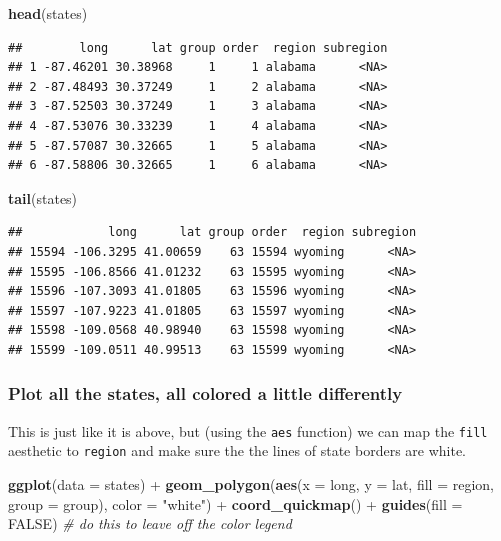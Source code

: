 \documentclass[]{book}
\newenvironment{Shaded}{\begin{snugshade}}{\end{snugshade}}
\newcommand{\KeywordTok}[1]{\textcolor[rgb]{0.13,0.29,0.53}{\textbf{{#1}}}}
\newcommand{\DataTypeTok}[1]{\textcolor[rgb]{0.13,0.29,0.53}{{#1}}}
\newcommand{\StringTok}[1]{\textcolor[rgb]{0.31,0.60,0.02}{{#1}}}
\newcommand{\CommentTok}[1]{\textcolor[rgb]{0.56,0.35,0.01}{\textit{{#1}}}}
\newcommand{\OtherTok}[1]{\textcolor[rgb]{0.56,0.35,0.01}{{#1}}}
\newcommand{\NormalTok}[1]{{#1}}
\theoremstyle{definition}
\theoremstyle{definition}
\theoremstyle{remark}
\begin{document}
\begin{Shaded}
\begin{Highlighting}[]
\KeywordTok{head}\NormalTok{(states)}
\end{Highlighting}
\end{Shaded}

\begin{verbatim}
##        long      lat group order  region subregion
## 1 -87.46201 30.38968     1     1 alabama      <NA>
## 2 -87.48493 30.37249     1     2 alabama      <NA>
## 3 -87.52503 30.37249     1     3 alabama      <NA>
## 4 -87.53076 30.33239     1     4 alabama      <NA>
## 5 -87.57087 30.32665     1     5 alabama      <NA>
## 6 -87.58806 30.32665     1     6 alabama      <NA>
\end{verbatim}

\begin{Shaded}
\begin{Highlighting}[]
\KeywordTok{tail}\NormalTok{(states)}
\end{Highlighting}
\end{Shaded}

\begin{verbatim}
##            long      lat group order  region subregion
## 15594 -106.3295 41.00659    63 15594 wyoming      <NA>
## 15595 -106.8566 41.01232    63 15595 wyoming      <NA>
## 15596 -107.3093 41.01805    63 15596 wyoming      <NA>
## 15597 -107.9223 41.01805    63 15597 wyoming      <NA>
## 15598 -109.0568 40.98940    63 15598 wyoming      <NA>
## 15599 -109.0511 40.99513    63 15599 wyoming      <NA>
\end{verbatim}

\subsubsection{Plot all the states, all colored a little
differently}\label{plot-all-the-states-all-colored-a-little-differently}

This is just like it is above, but (using the \texttt{aes} function) we
can map the \texttt{fill} aesthetic to \texttt{region} and make sure the
the lines of state borders are white.

\begin{Shaded}
\begin{Highlighting}[]
\KeywordTok{ggplot}\NormalTok{(}\DataTypeTok{data =} \NormalTok{states) +}\StringTok{ }
\StringTok{  }\KeywordTok{geom_polygon}\NormalTok{(}\KeywordTok{aes}\NormalTok{(}\DataTypeTok{x =} \NormalTok{long, }\DataTypeTok{y =} \NormalTok{lat, }\DataTypeTok{fill =} \NormalTok{region, }\DataTypeTok{group =} \NormalTok{group), }\DataTypeTok{color =} \StringTok{"white"}\NormalTok{) +}\StringTok{ }
\StringTok{  }\KeywordTok{coord_quickmap}\NormalTok{() +}
\StringTok{  }\KeywordTok{guides}\NormalTok{(}\DataTypeTok{fill =} \OtherTok{FALSE}\NormalTok{)  }\CommentTok{# do this to leave off the color legend}
\end{Highlighting}
\end{Shaded}
\end{document}
